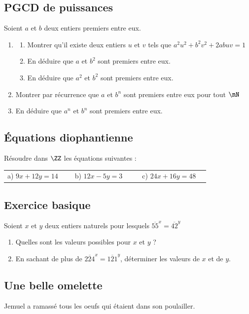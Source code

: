 \documentclass[oneside,12pt]{article}          %
\begin{document}
\subsection{PGCD de puissances}
Soient $a$ et $b$ deux entiers premiers entre eux.
\begin{enumerate}
	\item \begin{enumerate}
			\item Montrer qu'il existe deux entiers $u$ et $v$ tels que $a^2u^2+b^2v^2+2abuv=1$
			\item En déduire que $a$ et $b^2$ sont premiers entre eux.
			\item En déduire que $a^2$ et $b^2$ sont premiers entre eux.
		\end{enumerate}
	\item Montrer par récurrence que $a$ et $b^n$ sont premiers entre eux pour tout $\nN$
	\item En déduire que $a^n$ et $b^n$ sont premiers entre eux.
\end{enumerate}



\subsection{Équations diophantienne}
Résoudre dans $\ZZ$ les équations suivantes :

\begin{tabular}{p{0.3\linewidth} p{0.3\linewidth} p{0.3\linewidth}}
    a) $9x+12y=14$ & b) $12x-5y=3$ & c) $24x+16y=48$
\end{tabular}



\subsection{Exercice basique}
Soient $x$ et $y$ deux entiers naturels pour lesquels $\overline{55}^x=\overline{42}^y$
\begin{enumerate}
	\item Quelles sont les valeurs possibles pour $x$ et $y$ ?
	\item En sachant de plus de $\overline{224}^x=\overline{121}^y$, déterminer les valeurs de $x$ et de $y$.
\end{enumerate}



\subsection{Une belle omelette}
Jemuel a ramassé tous les oeufs qui étaient dans son poulailler.
\end{document}
